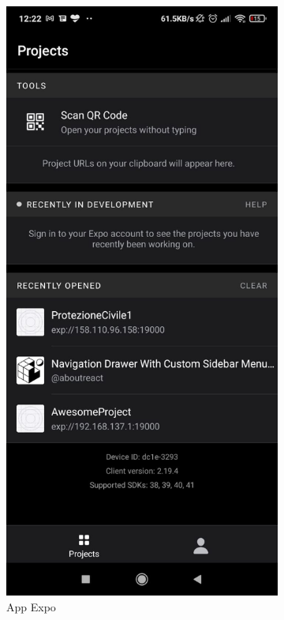 \documentclass[12pt,a4paper,twoside,english,italian]{book}
\begin{document}
\begin{figure}[H]
    \centering
    \begin{subfigure}{.4\textwidth}
      \centering
      \includegraphics[width=0.7\linewidth]{img/debug_app_1.jpeg}
      \caption{App Expo}
    \end{subfigure}%
    \begin{subfigure}{.4\textwidth}
      \centering

\end{subfigure}
\end{figure}
\end{document}
